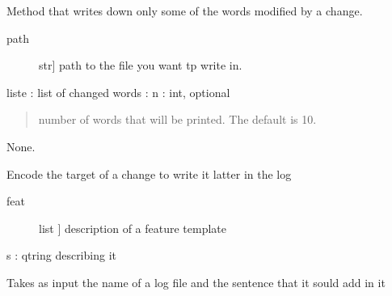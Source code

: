 \documentclass[letterpaper,10pt,english]{sphinxmanual}
\begin{document}

\begin{fulllineitems}
\label{\detokenize{index:log_utilities.samples2log}}
\sphinxAtStartPar
Method that writes down only some of the words modified by a change.
\begin{description}
\item[{path}] \leavevmode{[}str{]}
\sphinxAtStartPar
path to the file you want tp write in.

\end{description}

\sphinxAtStartPar
liste : list of changed words :
n : int, optional
\begin{quote}

\sphinxAtStartPar
number of words that will be printed. The default is 10.
\end{quote}

\sphinxAtStartPar
None.

\end{fulllineitems}


\begin{fulllineitems}
\label{\detokenize{index:log_utilities.target2str}}
\sphinxAtStartPar
Encode the target of a change to write it latter in the log
\begin{description}
\item[{feat}] \leavevmode{[}list {]}
\sphinxAtStartPar
description of a feature template

\end{description}

\sphinxAtStartPar
s : qtring describing it

\end{fulllineitems}


\begin{fulllineitems}
\label{\detokenize{index:log_utilities.write_in_log}}
\sphinxAtStartPar
Takes as input the name of a log file and the sentence that it sould add in it

\end{fulllineitems}
\end{document}
